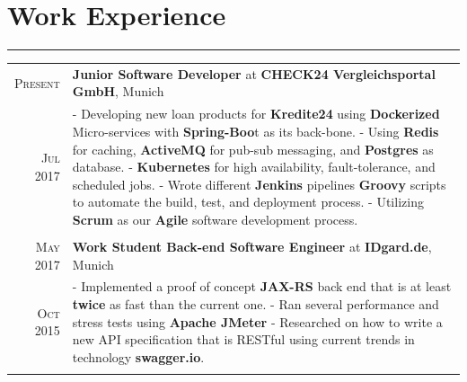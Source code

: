 \documentclass[a4paper,13pt]{article}
\begin{document}
\begin{adjustwidth}{-3cm}{}
\begin{figure}
\end{figure}






\section{Work Experience}
\rule[0pt]{20cm}{0.5pt}

\begin{tabular}{r|p{17.5cm}}
		
		\textsc{Present} & \textbf{Junior Software Developer} at \textbf{CHECK24 Vergleichsportal GmbH}, Munich \\
		\textsc{Jul 2017} & \footnotesize{
			- Developing new loan products for \textbf{Kredite24} using \textbf{Dockerized} Micro-services with \textbf{Spring-Boo}t as its back-bone.\newline
			- Using \textbf{Redis} for caching, \textbf{ActiveMQ} for pub-sub messaging, and \textbf{Postgres} as database. \newline
			 - \textbf{Kubernetes} for high availability, fault-tolerance, and scheduled jobs. \newline
						- Wrote different \textbf{Jenkins} pipelines \textbf{Groovy} scripts to automate the build, test, and deployment process. \newline
			-  Utilizing \textbf{Scrum} as our \textbf{Agile} software development process.
		}
		\\ \multicolumn{2}{c}{}\\
		
\textsc{May 2017} & \textbf{Work Student Back-end Software Engineer} at \textbf{IDgard.de}, Munich \\
\textsc{Oct 2015} & \footnotesize{
	- Implemented a proof of concept \textbf{JAX-RS} back end that is at least \textbf{twice} as fast than the current one.\newline
	- Ran several performance and stress tests using \textbf{Apache JMeter} \newline
	- Researched on how to write a new API specification that is RESTful using current trends in technology \textbf{swagger.io}.
}
\\ \multicolumn{2}{c}{}\\


\end{tabular}
\end{adjustwidth}
\end{document}
